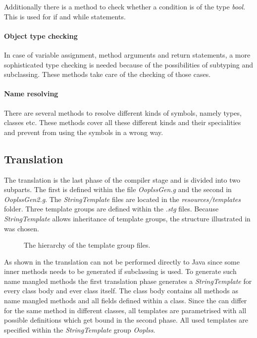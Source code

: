 Additionally there is a method to check whether a condition is of
the type \emph{bool}. This is used for if and while statements.

\paragraph{Object type checking}
In case of variable assignment, method arguments and return statements,
a more sophisticated type checking is needed because of the possibilities
of subtyping and subclassing. These methods take care of the checking
of those cases.

\paragraph{Name resolving}
There are several methods to resolve different kinds of symbols, namely
types, classes etc. These methods cover all these different kinds and their
specialities and prevent from using the symbols in a wrong way.

\subsection{Translation}
\label{ctr:translation}
The translation is the last phase of the compiler stage and is divided into
two subparts. The first is defined within the file \emph{OoplssGen.g} and the
second in \emph{OoplssGen2.g}. The \emph{StringTemplate} files are located
in the \emph{resources/templates} folder. Three template groups are defined
within the \emph{.stg} files. Because \emph{StringTemplate} allows inheritance of
template groups, the structure illustrated in 
was chosen.

\begin{figure}[ht]
	\centering
	\caption{The hierarchy of the template group files.}
	\label{fig:templateHierarchy}
\end{figure}

As shown in  the translation can not be
performed directly to Java since some inner methods needs to be generated
if subclassing is used. To generate such name mangled methods the first
translation phase generates a \emph{StringTemplate} for every class body
and ever class itself. The class body contains all methods as name mangled
methods and all fields defined within a class. Since the \mytype can differ
for the same method in different classes, all templates are parametrised
with all possible \mytype definitions which get bound in the second phase.
All used templates are specified within the \emph{StringTemplate} group
\emph{Ooplss}.

